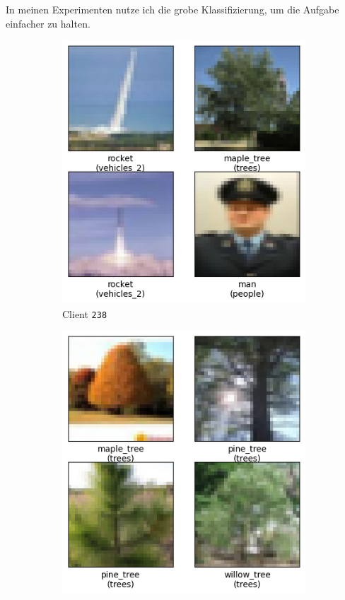 In meinen Experimenten nutze ich die grobe Klassifizierung, um die Aufgabe einfacher zu halten.

\begin{figure}[tb]
    \centering
    \begin{subfigure}{0.4\textwidth}
		\centering        
        \includegraphics[width=\linewidth]{Bilder/cifar_client1.png}
        \caption{Client \texttt{238}}
    \end{subfigure}
    \hfill
    \begin{subfigure}{0.4\textwidth}
    		\centering        
        \includegraphics[width=\linewidth]{Bilder/cifar_client2.png}

\end{subfigure}
\end{figure}
